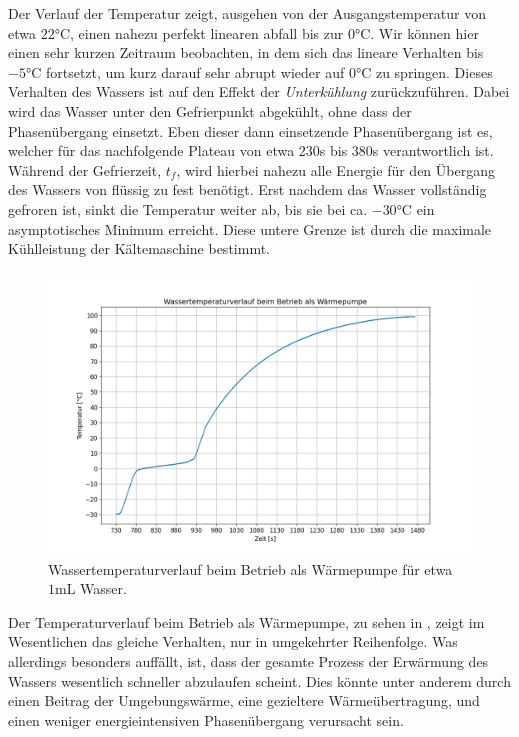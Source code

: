 Der Verlauf der Temperatur zeigt, ausgehen von der Ausgangstemperatur von etwa $22\si{\celsius}$, einen nahezu perfekt linearen abfall bis zur $0\si{\celsius}$. Wir können hier einen sehr kurzen Zeitraum beobachten, in dem sich das lineare Verhalten bis $-5\si{\celsius}$ fortsetzt, um kurz darauf sehr abrupt wieder auf $0\si{\celsius}$ zu springen. Dieses Verhalten des Wassers ist auf den Effekt der \textit{Unterkühlung} zurückzuführen. Dabei wird das Wasser unter den Gefrierpunkt abgekühlt, ohne dass der Phasenübergang einsetzt. Eben dieser dann einsetzende Phasenübergang ist es, welcher für das nachfolgende Plateau von etwa 230s bis 380s verantwortlich ist. Während der Gefrierzeit, $t_f$, wird hierbei nahezu alle Energie für den Übergang des Wassers von flüssig zu fest benötigt. Erst nachdem das Wasser vollständig gefroren ist, sinkt die Temperatur weiter ab, bis sie bei ca. $-30 \si{\celsius}$ ein asymptotisches Minimum erreicht. Diese untere Grenze ist durch die maximale Kühlleistung der Kältemaschine bestimmt. 

\begin{figure}[H]
    \centering
    \includegraphics[width=.9\textwidth]{files/tempverlauf_warm.png}
    \caption{Wassertemperaturverlauf beim Betrieb als Wärmepumpe für etwa $1 \si{\milli\liter}$ Wasser.}
    \label{fig:tempverlauf_warm}
\end{figure}

Der Temperaturverlauf beim Betrieb als Wärmepumpe, zu sehen in , zeigt im Wesentlichen das gleiche Verhalten, nur in umgekehrter Reihenfolge. Was allerdings besonders auffällt, ist, dass der gesamte Prozess der Erwärmung des Wassers wesentlich schneller abzulaufen scheint. Dies könnte unter anderem durch einen Beitrag der Umgebungswärme, eine gezieltere Wärmeübertragung, und einen weniger energieintensiven Phasenübergang verursacht sein.

